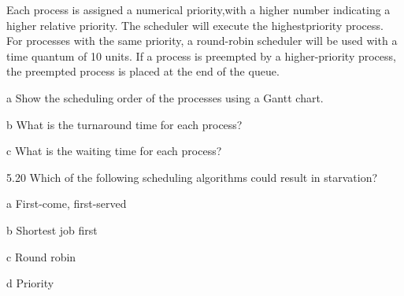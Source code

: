 \documentclass[12pt,a4paper]{article}
\newenvironment{problems}{\begin{list}{}{\renewcommand{\makelabel}[1]{\textbf{##1}\hfil}}}{\end{list}}
\newenvironment{steps}{\begin{list}{}{\renewcommand{\makelabel}[1]{##1.\hfil}}}{\end{list}}
\begin{document}
\begin{problems}
Each process is assigned a numerical priority,with a higher number indicating
a higher relative priority. The scheduler will execute the highestpriority
process. For processes with the same priority, a round-robin
scheduler will be used with a time quantum of 10 units. If a process is
preempted by a higher-priority process, the preempted process is placed
at the end of the queue.

\begin{steps}
    \item[a] Show the scheduling order of the processes using a Gantt chart.
    \item[b]  What is the turnaround time for each process?
    \item[c]  What is the waiting time for each process?
\end{steps}

\item[5.20] Which of the following scheduling algorithms could result in starvation?
\begin{steps}
    \item[a] First-come, first-served
    \item[b]  Shortest job first
    \item[c]  Round robin
    \item[d]  Priority
\end{steps} 

\end{problems}
\end{document}
